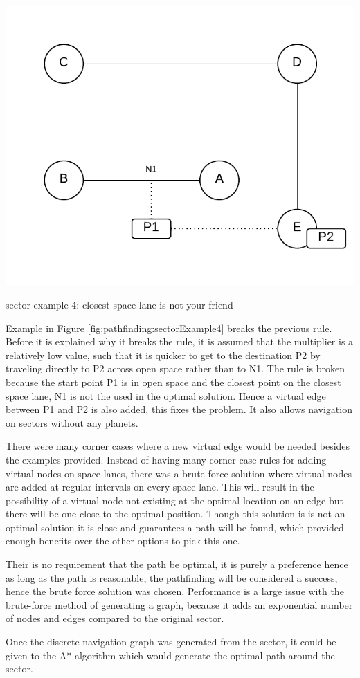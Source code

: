 \begin{marginfigure}
	\includegraphics{res/pathfinding/PathFindingSector4.pdf}
    \caption{sector example 4: closest space lane is not your friend}
	\label{fig:pathfinding:sectorExample4}
\end{marginfigure}

Example in Figure \ref{fig:pathfinding:sectorExample4} breaks the previous rule.
Before it is explained why it breaks the rule, it is assumed that the multiplier is a relatively low value, such that it is quicker to get to the destination P2 by traveling directly to P2 across open space rather than to N1.
The rule is broken because the start point P1 is in open space and the closest point on the closest space lane, N1 is not the used in the optimal solution.
Hence a virtual edge between P1 and P2 is also added, this fixes the problem.
It also allows navigation on sectors without any planets.

There were many corner cases where a new virtual edge would be needed besides the examples provided.
Instead of having many corner case rules for adding virtual nodes on space lanes, there was a brute force solution where virtual nodes are added at regular intervals on every space lane. 
This will result in the possibility of a virtual node not existing at the optimal location on an edge but there will be one close to the optimal position.
Though this solution is is not an optimal solution it is close and guarantees a path will be found, which provided enough benefits over the other options to pick this one.

Their is no requirement that the path be optimal, it is purely a preference hence as long as the path is reasonable, the pathfinding will be considered a success, hence the brute force solution was chosen.
Performance is a large issue with the brute-force method of generating a graph, because it adds an exponential number of nodes and edges compared to the original sector. 

Once the discrete navigation graph was generated from the sector, it could be given to the A* algorithm which would generate the optimal path around the sector.


